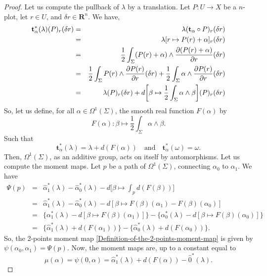\documentclass[10pt,reqno,twoside]{amsart}
\newcommand{\qmbox}[1]{\quad\mbox{#1}\quad}
\newcommand{\RR}{\mathbf{R}}
\newcommand{\undemi}{\frac{1}{2}}
\newcommand{\et}{\mathbf{t}}
\theoremstyle{plain}
\theoremstyle{definition}
\begin{document}
  \begin{proof}
    Let us compute the pullback of $\lambda$ by a translation.
    Let $P : U \to X$ be a $n$-plot,
    let $r \in U$,
    and $\delta r \in \RR^n$.
    We have,
    \begin{eqnarray*}
      \et_\alpha^*(\lambda)(P)_r(\delta r)
      & = & \lambda(\et_\alpha \circ P)_r(\delta r) \\
      & = & \lambda[r \mapsto P (r) + \alpha]_r(\delta r) \\
      & = & \undemi \int_\Sigma (P (r)+\alpha) \wedge {\partial (P (r) +\alpha) \over \partial r}(\delta r)\\ & = & \undemi \int_\Sigma P (r) \wedge {\partial P (r) \over \partial r}(\delta r) + \undemi \int_\Sigma \alpha \wedge {\partial P (r) \over \partial r}(\delta r) \\
      & = & \lambda(P)_r(\delta r) + d\bigg[\beta \mapsto \undemi \int_\Sigma \alpha \wedge \beta \bigg](P)_r(\delta r)
    \end{eqnarray*}
    So,
    let us define,
    for all $\alpha \in \Omega^1(\Sigma)$,
    the smooth real function $F(\alpha)$ by
    $$
      F(\alpha) : \beta \mapsto \undemi \int_\Sigma \alpha \wedge \beta.
      $$
    Such that
    $$ \et_\alpha^*(\lambda) = \lambda + d(F(\alpha)) \qmbox{and} \et_\alpha^*(\omega) = \omega.
      $$
    Then,
    $\Omega^1(\Sigma)$,
    as an additive group,
    acts on itself by automorphisms.
    Let us compute the moment maps.
    Let $p$ be a path of $\Omega^1(\Sigma)$,
    connecting $\alpha_0$ to $\alpha_1$.
    We have
    \begin{eqnarray*}
      \Psi(p) & = & \hat \alpha_1^*(\lambda) - \hat \alpha_0^*(\lambda) - d\bigg[\beta \mapsto \int_p d (F(\beta))\bigg] \\
      & = & \hat \alpha_1^*(\lambda) - \hat \alpha_0^*(\lambda) - d[\beta \mapsto F(\beta)(\alpha_1) - F(\beta)(\alpha_0)] \\
      & = & \{\alpha_1^*(\lambda) - d[\beta \mapsto F(\beta)(\alpha_1)]\} - \{\alpha_0^*(\lambda) - d[\beta \mapsto F(\beta)(\alpha_0)]\} \\
      & = & \{\hat \alpha_1^*(\lambda) + d(F(\alpha_1))\} - \{\hat \alpha_0^*(\lambda) + d(F(\alpha_0))\}.
    \end{eqnarray*}
    So,
    the 2-points moment map \ref{Definition-of-the-2-points-moment-map} is given by $\psi(\alpha_0,\alpha_1) = \Psi(p)$.
    Now,
    the moment maps are,
    up to a constant equal to
    $$
      \mu(\alpha) = \psi(0,\alpha) = \hat \alpha_1^*(\lambda) + d(F(\alpha)) - \hat 0^*(\lambda).
$$
\end{proof}
\end{document}
